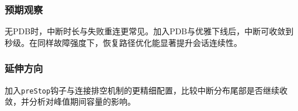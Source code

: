 \subsubsection{预期观察}
无PDB时，中断时长与失败重连更常见。加入PDB与优雅下线后，中断可收敛到秒级。在同样故障强度下，恢复路径优化能显著提升会话连续性。

\subsubsection{延伸方向}
加入\texttt{preStop}钩子与连接排空机制的更精细配置，比较中断分布尾部是否继续收敛，并分析对峰值期间容量的影响。

\newpage
